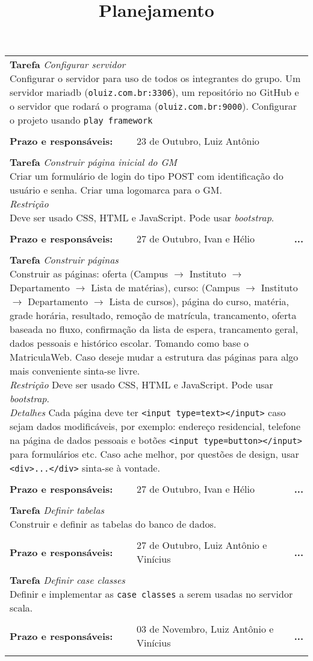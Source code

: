 \documentclass{article}
\title{Planejamento}
\date{}
\newcommand{\pendente}{\textbf{...}}
\newcommand{\concluido}{\checkmark}
\newenvironment{tarefas}{\begin{longtable}{llr}}{\end{longtable}}
\newcommand{\tarefa}[5]{
  \multicolumn{3}{l}{\parbox{15cm}{\textbf{Tarefa} \emph{#1}\\ #2}}
	\\\\\hline\textbf{Prazo e responsáveis:} & #3, #4  & #5\\\hline\\
}
\begin{document}
  \maketitle
  \begin{tarefas}
	  \tarefa{Configurar servidor}{
	    Configurar o servidor para uso de todos os integrantes do grupo. Um servidor mariadb (\texttt{oluiz.com.br:3306}), um repositório no GitHub e o servidor que rodará o programa (\texttt{oluiz.com.br:9000}). Configurar o projeto usando \texttt{play framework}
	  }{23 de Outubro}{Luiz Antônio}{\concluido}
	  \tarefa{Construir página inicial do GM}{
		  Criar um formulário de login do tipo POST com identificação do usuário e senha. Criar uma logomarca para o GM.\\
		  \emph{Restrição}\\
		  Deve ser usado CSS, HTML e JavaScript. Pode usar \textit{bootstrap}.
	  }{27 de Outubro}{Ivan e Hélio}{\pendente}
	  \tarefa{Construir páginas}{
	    Construir as páginas: oferta (Campus $\rightarrow$ Instituto $\rightarrow$ Departamento $\rightarrow$ Lista de matérias), curso: (Campus $\rightarrow$ Instituto $\rightarrow$ Departamento $\rightarrow$ Lista de cursos), página do curso, matéria, grade horária, resultado, remoção de matrícula, trancamento, oferta baseada no fluxo, confirmação da lista de espera, trancamento geral, dados pessoais e histórico escolar.
		  Tomando como base o MatriculaWeb. Caso deseje mudar a estrutura das páginas para algo mais conveniente sinta-se livre.\\
		  \emph{Restrição}
		  Deve ser usado CSS, HTML e JavaScript. Pode usar \textit{bootstrap}.\\
		  \emph{Detalhes}
		  Cada página deve ter \texttt{<input type=\textquotedbl text\textquotedbl></input>} caso sejam dados modificáveis, por exemplo: endereço residencial, telefone na página de dados pessoais e botões \texttt{<input type=\textquotedbl button\textquotedbl></input>} para formulários etc. Caso ache melhor, por questões de design, usar \texttt{<div>...</div>} sinta-se à vontade.
	  }{27 de Outubro}{Ivan e Hélio}{\pendente}
	  \tarefa{Definir tabelas}{
	    Construir e definir as tabelas do banco de dados. 
	  }{27 de Outubro}{Luiz Antônio e Vinícius}{\pendente}
	  \tarefa{Definir case classes}{
	    Definir e implementar as \texttt{case classes} a serem usadas no servidor scala.
	  }{03 de Novembro}{Luiz Antônio e Vinícius}{\pendente}
	\end{tarefas}
\end{document}
